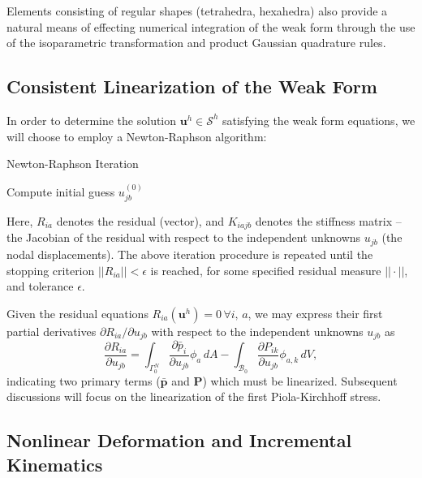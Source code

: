 Elements consisting of regular shapes (tetrahedra, hexahedra) also provide a natural means of effecting numerical integration of the weak form through the use of the isoparametric transformation and product Gaussian quadrature rules.

\subsection*{Consistent Linearization of the Weak Form}

	In order to determine the solution $\mathbf{u}^h \in \mathcal{S}^h$ satisfying the weak form equations, we will choose to employ a Newton-Raphson algorithm:
	
\begin{algorithm}
 \caption{Newton-Raphson Iteration}
 \label{alg:newtonraphson}
 	Compute initial guess $u_{jb}^{(0)}$ \;
\end{algorithm}

	Here, $R_{ia}$ denotes the residual (vector), and $K_{iajb}$ denotes the stiffness matrix -- the Jacobian of the residual with respect to the independent unknowns $u_{jb}$ (the nodal displacements). The above iteration procedure is repeated until the stopping criterion $||R_{ia}|| < \epsilon$ is reached, for some specified residual measure $||\cdot||$, and tolerance $\epsilon$.
		
	Given the residual equations $R_{ia} (\mathbf{u}^h) = 0 \, \forall i, \, a$, we may express their first partial derivatives $\partial R_{ia} / \partial u_{jb}$ with respect to the independent unknowns $u_{jb}$ as
	\begin{equation}
	  \frac{\partial R_{ia}}{\partial u_{jb}} =
	  \int_{\Gamma^N_0} \frac{\partial \bar{p}_i}{\partial u_{jb}}  \phi_a \, dA
	 - \int_{\mathcal{B}_0} \frac{\partial P_{ik}}{\partial u_{jb}} \phi_{a,k} \, dV,
	\end{equation}
	indicating two primary terms ($\bar{\mathbf{p}}$ and $\mathbf{P}$) which must be linearized. Subsequent discussions will focus on the linearization of the first Piola-Kirchhoff stress.
	
\subsection*{Nonlinear Deformation and Incremental Kinematics}

